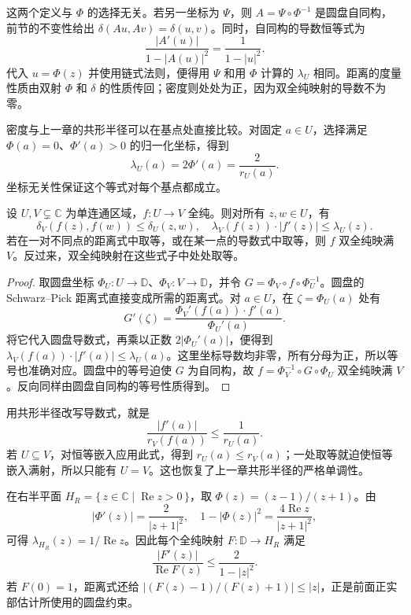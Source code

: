 这两个定义与 \(\Phi\) 的选择无关。若另一坐标为 \(\Psi\)，则 \(A=\Psi\circ\Phi^{-1}\) 是圆盘自同构，前节的不变性给出 \(\delta(Au,Av)=\delta(u,v)\)。同时，自同构的导数恒等式为
\[
 \frac{|A'(u)|}{1-|A(u)|^2}=\frac1{1-|u|^2}.
\]
代入 \(u=\Phi(z)\) 并使用链式法则，便得用 \(\Psi\) 和用 \(\Phi\) 计算的 \(\lambda_U\) 相同。距离的度量性质由双射 \(\Phi\) 和 \(\delta\) 的性质传回；密度则处处为正，因为双全纯映射的导数不为零。

\ProseParagraphBreak

密度与上一章的共形半径可以在基点处直接比较。对固定 \(a\in U\)，选择满足 \(\Phi(a)=0\)、\(\Phi'(a)>0\) 的归一化坐标，得到
\[
 \lambda_U(a)=2\Phi'(a)=\frac2{r_U(a)}.
\]
坐标无关性保证这个等式对每个基点都成立。

\begin{proposition}\label{b3:prop:06-conformal-schwarz-pick}
设 \(U,V\subsetneq\mathbb C\) 为单连通区域，\(f:U\rightarrow V\) 全纯。则对所有 \(z,w\in U\)，有
\[
 \delta_V(f(z),f(w))\le\delta_U(z,w),
 \quad \lambda_V(f(z))\cdot|f'(z)|\le\lambda_U(z).
\]
若在一对不同点的距离式中取等，或在某一点的导数式中取等，则 \(f\) 双全纯映满 \(V\)。反过来，双全纯映射在这些式子中处处取等。
\end{proposition}
\begin{proof}
取圆盘坐标 \(\Phi_U:U\rightarrow\mathbb D\)、\(\Phi_V:V\rightarrow\mathbb D\)，并令 \(G=\Phi_V\circ f\circ\Phi_U^{-1}\)。圆盘的 Schwarz--Pick 距离式直接变成所需的距离式。对 \(a\in U\)，在 \(\zeta=\Phi_U(a)\) 处有
\[
 G'(\zeta)=\frac{\Phi_V'(f(a))\cdot f'(a)}{\Phi_U'(a)}.
\]
将它代入圆盘导数式，再乘以正数 \(2|\Phi_U'(a)|\)，便得到 \(\lambda_V(f(a))\cdot|f'(a)|\le\lambda_U(a)\)。这里坐标导数均非零，所有分母为正，所以等号也准确对应。圆盘中的等号迫使 \(G\) 为自同构，故 \(f=\Phi_V^{-1}\circ G\circ\Phi_U\) 双全纯映满 \(V\)。反向同样由圆盘自同构的等号性质得到。
\end{proof}

用共形半径改写导数式，就是
\[
 \frac{|f'(a)|}{r_V(f(a))}\le\frac1{r_U(a)}.
\]
若 \(U\subseteq V\)，对恒等嵌入应用此式，得到 \(r_U(a)\le r_V(a)\)；一处取等就迫使恒等嵌入满射，所以只能有 \(U=V\)。这也恢复了上一章共形半径的严格单调性。

\ProseParagraphBreak

在右半平面 \(H_R=\{\,z\in\mathbb C\mid\operatorname{Re}z>0\,\}\)，取 \(\Phi(z)=(z-1)/(z+1)\)。由
\[
 |\Phi'(z)|=\frac2{|z+1|^2},
 \quad 1-|\Phi(z)|^2=\frac{4\operatorname{Re}z}{|z+1|^2},
\]
可得 \(\lambda_{H_R}(z)=1/\operatorname{Re}z\)。因此每个全纯映射 \(F:\mathbb D\rightarrow H_R\) 满足
\[
 \frac{|F'(z)|}{\operatorname{Re}F(z)}\le\frac2{1-|z|^2}.
\]
若 \(F(0)=1\)，距离式还给 \(|(F(z)-1)/(F(z)+1)|\le|z|\)，正是前面正实部估计所使用的圆盘约束。


